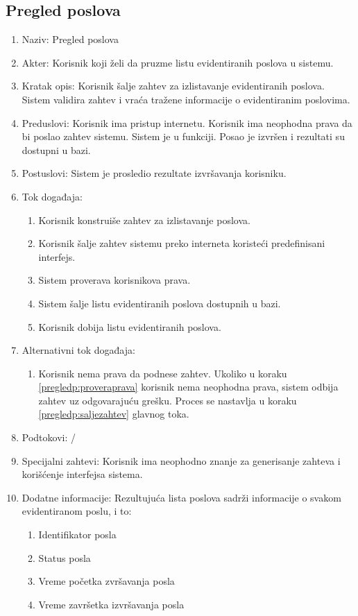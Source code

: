 \documentclass[12pt,oneside]{memoir}
\begin{document}
\subsection{Pregled poslova}
\begin{enumerate}
\item Naziv: Pregled poslova
\item Akter: Korisnik koji želi da pruzme listu evidentiranih poslova u sistemu.
\item Kratak opis: Korisnik šalje zahtev za izlistavanje evidentiranih poslova. Sistem validira zahtev i vraća tražene informacije o evidentiranim poslovima.
\item Preduslovi: Korisnik ima pristup internetu. Korisnik ima neophodna prava da bi poslao zahtev sistemu. Sistem je u funkciji. Posao je izvršen i rezultati su dostupni u bazi.
\item Postuslovi: Sistem je prosledio rezultate izvršavanja korisniku.
\item Tok događaja:
	\begin{enumerate}
	\item \label{pregledp:konstruisezahtev} Korisnik konstruiše zahtev za izlistavanje poslova.
	\item \label{pregledp:saljezahtev} Korisnik šalje zahtev sistemu preko interneta koristeći predefinisani interfejs.
	\item \label{pregledp:proveraprava} Sistem proverava korisnikova prava.
	\item \label{pregledp:slanjeliste} Sistem šalje listu evidentiranih poslova dostupnih u bazi.
	\item Korisnik dobija listu evidentiranih poslova.
	\end{enumerate}
\item Alternativni tok događaja:
	\begin{enumerate}
	\item Korisnik nema prava da podnese zahtev. Ukoliko u koraku \ref{pregledp:proveraprava} korisnik nema neophodna prava, sistem odbija zahtev uz odgovarajuću grešku. Proces se nastavlja u koraku \ref{pregledp:saljezahtev} glavnog toka.
	\end{enumerate}
\item Podtokovi: /
\item Specijalni zahtevi: Korisnik ima neophodno znanje za generisanje zahteva i korišćenje interfejsa sistema.
\item Dodatne informacije: Rezultujuća lista poslova sadrži informacije o svakom evidentiranom poslu, i to:
	\begin{enumerate}
	\item Identifikator posla
	\item Status posla
	\item Vreme početka zvršavanja posla
	\item Vreme završetka izvršavanja posla
	\end{enumerate}
\end{enumerate}
\end{document}
